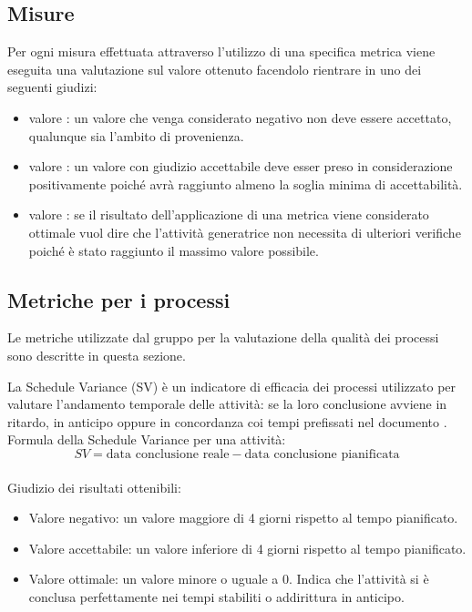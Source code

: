 \documentclass[a4paper, titlepage]{article}
\begin{document}
\subsection{Misure}
Per ogni misura effettuata attraverso l'utilizzo di una specifica metrica viene eseguita una valutazione sul valore ottenuto facendolo rientrare in uno dei seguenti giudizi:
\begin{itemize}
	\item valore : un valore che venga considerato negativo non deve essere accettato, qualunque sia l'ambito di provenienza.
	\item valore : un valore con giudizio accettabile deve esser preso in considerazione positivamente poiché avrà raggiunto almeno la soglia minima di accettabilità.
	\item valore : se il risultato dell'applicazione di una metrica viene considerato ottimale vuol dire che l'attività generatrice non necessita di ulteriori verifiche poiché è stato raggiunto il massimo valore possibile.
\end{itemize} 

\subsection{Metriche per i processi}
Le metriche utilizzate dal gruppo per la valutazione della qualità dei processi sono descritte in questa sezione.

\label{par:SV}
La Schedule Variance (SV) è un indicatore di efficacia dei processi utilizzato per valutare l'andamento temporale delle attività: se la loro conclusione avviene in ritardo, in anticipo oppure in concordanza coi tempi prefissati nel documento .
\newline Formula della Schedule Variance per una attività:
\begin{displaymath}
SV= \mbox{data conclusione reale} - \mbox{data conclusione pianificata}
\end{displaymath}
\\Giudizio dei risultati ottenibili:
\begin{itemize}
\item Valore negativo: un valore maggiore di 4 giorni rispetto al tempo pianificato.
\item Valore accettabile: un valore inferiore di 4 giorni rispetto al tempo pianificato.
\item Valore ottimale: un valore minore o uguale a 0. Indica che l'attività si è conclusa perfettamente nei tempi stabiliti o addirittura in anticipo. 
\end{itemize}
\end{document}
